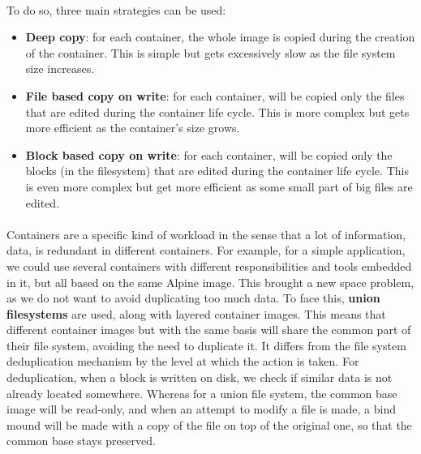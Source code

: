 \paragraph{} To do so, three main strategies can be used:
\begin{itemize}
\renewcommand\labelitemi{--}
  \item \textbf{Deep copy}: for each container, the whole image is copied during the creation of the container.  This is simple but gets excessively slow as the file system size increases.
  \item \textbf{File based copy on write}: for each container, will be copied only the files that are edited during the container life cycle.  This is more complex but gets more efficient as the container's size grows.
  \item \textbf{Block based copy on write}: for each container, will be copied only the blocks (in the filesystem) that are edited during the container life cycle.  This is even more complex but get more efficient as some small part of big files are edited.
\end{itemize}

\paragraph{}Containers are a specific kind of workload in the sense that a lot of information, data, is redundant in different containers.  For example, for a simple application, we could use several containers with different responsibilities and tools embedded in it, but all based on the same Alpine image.  This brought a new space problem, as we do not want to avoid duplicating too much data.  To face this, \textbf{union filesystems} are used, along with layered container images.  This means that different container images but with the same basis will share the common part of their file system, avoiding the need to duplicate it.  It differs from the file system deduplication mechanism by the level at which the action is taken.  For deduplication, when a block is written on disk, we check if similar data is not already located somewhere.  Whereas for a union file system, the common base image will be read-only, and when an attempt to modify a file is made, a bind mound will be made with a copy of the file on top of the original one, so that the common base stays preserved.

